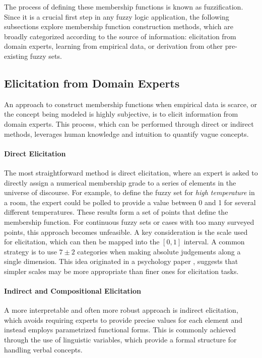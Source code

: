 The process of defining these membership functions is known as fuzzification. Since it is a crucial first step in any fuzzy logic application, the following subsections explore membership function construction methods, which are broadly categorized according to the source of information: elicitation from domain experts, learning from empirical data, or derivation from other pre-existing fuzzy sets.

\subsection{Elicitation from Domain Experts}
An approach to construct membership functions when empirical data is scarce, or the concept being modeled is highly subjective, is to elicit information from domain experts. This process, which can be performed through direct or indirect methods, leverages human knowledge and intuition to quantify vague concepts.

\paragraph{Direct Elicitation}
The most straightforward method is direct elicitation, where an expert is asked to directly assign a numerical membership grade to a series of elements in the universe of discourse. For example, to define the fuzzy set for \emph{high temperature} in a room, the expert could be polled to provide a value between 0 and 1 for several different temperatures. These results form a set of points that define the membership function. For continuous fuzzy sets or cases with too many surveyed points, this approach becomes unfeasible. A key consideration is the scale used for elicitation, which can then be mapped into the $[0,1]$ interval. A common strategy is to use $7\pm2$ categories when making absolute judgements along a single dimension. This idea originated in a psychology paper \cite{miller1956magical}, suggests that simpler scales may be more appropriate than finer ones for elicitation tasks.

\paragraph{Indirect and Compositional Elicitation}
A more interpretable and often more robust approach is indirect elicitation, which avoids requiring experts to provide precise values for each element and instead employs parametrized functional forms. This is commonly achieved through the use of linguistic variables, which provide a formal structure for handling verbal concepts.

